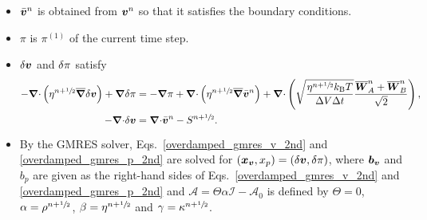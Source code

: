 \documentclass[
10pt
showpacs, showkeys,
amsmath,amssymb,
aps,
pre,
floatfix,
]{revtex4-1}
\newcommand{\divg}{{\V\nabla\cdot}}                       %
\newcommand{\paren}[1]{{(#1)}}                            %
\begin{document}
\begin{enumerate}
\begin{itemize}
\item $\bar{\boldsymbol{v}}^n$ is obtained from $\boldsymbol{v}^n$ so that it satisfies the boundary conditions.
\item $\pi$ is $\pi^\paren{1}$ of the current time step.
\item $\delta\boldsymbol{v}$ and $\delta\pi$ satisfy
\begin{align}
\label{overdamped_gmres_v_2nd}
-\divg\left(\eta^{n+\myhalf}\overline{\grad}\d{\V{v}}\right) + \grad\d{\pi}
& = -\grad\pi +\divg\left( \eta^{n+\myhalf} \overline{\grad}\bar{\V{v}}^n \right)
+ \divg\left( \sqrt{\frac{\eta^{n+\myhalf} k_\mathrm{B}T}{\D{V}\D{t}} } \frac{\overline{\V{W}}^n_A + \overline{\V{W}}^n_B}{\sqrt{2}} \right), \\
\label{overdamped_gmres_p_2nd}
-\divg\d{\V{v}} & = \divg\bar{\V{v}}^n-S^{n+\myhalf}.
\end{align}
\item By the GMRES solver, Eqs.~\eqref{overdamped_gmres_v_2nd} and \eqref{overdamped_gmres_p_2nd} are solved for $(\boldsymbol{x}_{\boldsymbol{v}},x_p)=(\delta\boldsymbol{v},\delta\pi)$, where $\boldsymbol{b}_{\boldsymbol{v}}$ and $b_p$ are given as the right-hand sides of Eqs.~\eqref{overdamped_gmres_v_2nd} and \eqref{overdamped_gmres_p_2nd} and $\mathcal{A}=\Theta\alpha\mathcal{I}-\mathcal{A}_0$ is defined by $\Theta=0$, $\alpha=\rho^{n+\sfrac{1}{2}}$, $\beta=\eta^{n+\sfrac{1}{2}}$ and $\gamma=\kappa^{n+\sfrac{1}{2}}$.
\end{itemize}

\end{enumerate}
\end{document}
